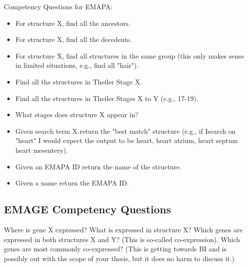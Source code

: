 Competency Questions for EMAPA:
\begin{itemize}
\item For structure X, find all the ancestors.
\item For structure X, find all the decedents.
\item For structure X, find all structures in the same group (this only makes sense in limited situations, e.g., find all "hair").
\item Find all the structures in Theiler Stage X.
\item Find all the structures in Theiler Stages X to Y (e.g., 17-19).
\item What stages does structure X appear in?
\item Given search term X return the "best match" structure (e.g., if Isearch on "heart" I would expect the output to be heart, heart atrium, heart septum  heart mesentery).
\item Given an EMAPA ID return the name of the structure.
\item Given a name return the EMAPA ID.
\end{itemize}

\subsection{EMAGE Competency Questions}
Where is gene X expressed?
What is expressed in structure X?
Which genes are expressed in both structures X and Y?  (This is
so-called co-expression).
Which genes are most commonly co-expressed? (This is getting towards
BI and is possibly out with the scope of your thesis, but it does no
harm to discuss it.)
